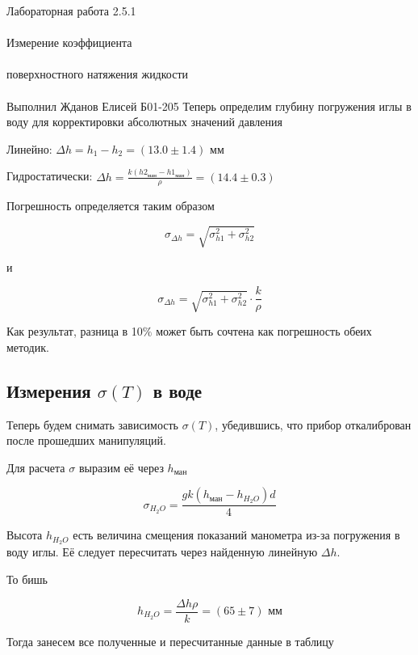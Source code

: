 \documentclass{astroedu-lab}
\begin{document}
\begin{problem}{\huge Лабораторная работа 2.5.1\\\\Измерение коэффициента\\\\поверхностного натяжения жидкости\\\\Выполнил Жданов Елисей Б01-205}
Теперь определим глубину погружения иглы в воду для корректировки абсолютных значений давления

Линейно: $\Delta h = h_1 - h_2 = (13.0 \pm 1.4) \text{ мм}$

Гидростатически: $\Delta h = \frac{k (h2 _\text{ман} - h1 _\text{ман})}{\rho} = (14.4 \pm 0.3)$

Погрешность определяется таким образом

\begin{equation}
	\sigma_{\Delta h} = \sqrt{\sigma_{h1}^2 + \sigma_{h2}^2}
\end{equation}

и

\begin{equation}
	\sigma_{\Delta h} = \sqrt{\sigma_{h1}^2 + \sigma_{h2}^2} \cdot  \frac{k}{\rho}
\end{equation}

Как результат, разница в 10$\%$ может быть сочтена как погрешность обеих методик.

\subsection{Измерения $\sigma(T)$ в воде}

Теперь будем снимать зависимость $\sigma(T)$, убедившись, что прибор откалиброван после прошедших манипуляций.

Для расчета $\sigma$ выразим её через $h_\text{ман}$

\begin{equation}
	\sigma_{H_2 O} = \frac{g k (h_\text{ман} - h_{H_2 O}) d}{4}
\end{equation}

Высота $h_{H_2 O}$ есть величина смещения показаний манометра из-за погружения в воду иглы. Её следует пересчитать через найденную линейную $\Delta h$.

То бишь

\begin{equation}
	h_{H_2 O} = \frac{\Delta h \rho}{k} = (65 \pm 7) \text{ мм}
\end{equation}

Тогда занесем все полученные и пересчитанные данные в таблицу


\end{problem}
\end{document}
